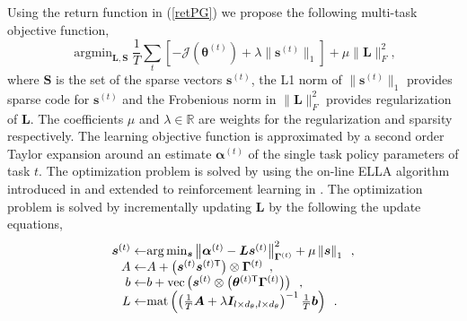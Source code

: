 \documentclass{aamas2016}
\renewcommand{\Re}{\mathbb{R}}
\newcommand{\transpose}{\text{$\mathsf{T}$}}
\DeclareMathOperator*{\argmin}{argmin}
\begin{document}
Using the return function in (\ref{retPG}) we propose the following multi-task objective function,
\begin{displaymath}
 \argmin_{\boldsymbol{L},\boldsymbol{S}}\frac{1}{T}\sum_{t}\left[ -\mathcal{J}(\boldsymbol{\theta}^{(t)}) + \lambda \| \boldsymbol{s}^{(t)} \|_{1} \right] + \mu\|\boldsymbol{L}\|_{F}^{2},
\end{displaymath}
where $\boldsymbol{S}$ is the set of the sparse vectors $\boldsymbol{s}^{(t)}$, the L1 norm of $\| \boldsymbol{s}^{(t)} \|_{1}$ 
provides sparse code for $\boldsymbol{s}^{(t)}$ and the Frobenious norm in $\|\boldsymbol{L}\|_{F}^{2}$ provides regularization of $\mathbf{L}$. The
coefficients $\mu$ and $\lambda \in \Re$ are weights for the regularization and sparsity respectively.
The learning objective function is approximated by a second order Taylor expansion around an estimate $\boldsymbol{\alpha}^{(t)}$ of
the single task policy parameters of task $t$. The optimization
problem is solved by using the on-line ELLA algorithm introduced in \cite{Ruvolo2013} and extended to reinforcement 
learning in \cite{BouAmmar2014a}. The optimization problem is solved by incrementally updating $\mathbf{L}$ by the following the
update equations,
\begin{equation}
\begin{array}{r@{}l}
 \boldsymbol{s}^{(t)}  \leftarrow&  \arg\min_{\boldsymbol{s}} \left\| \boldsymbol{\alpha}^{(t)}-\boldsymbol{L}\boldsymbol{s}^{(t)}\right\|_{\boldsymbol{\Gamma}^{(t)}}^{2} + \mu\left\|\boldsymbol{s}\right\|_{1} \enspace, \\%
 A  \leftarrow & A + \left(\boldsymbol{s}^{(t)}\boldsymbol{s}^{(t)\transpose} \right) \otimes \boldsymbol{\Gamma}^{(t)} \enspace, \\%
 b  \leftarrow &b + \mbox{vec}\left(  \boldsymbol{s}^{(t)} \otimes \left( \boldsymbol{\theta}^{(t)\transpose}\boldsymbol{\Gamma}^{(t)} \right) \right) \enspace, \\%
 L \leftarrow& \mbox{mat} \left( \left( \frac{1}{T}\boldsymbol{A} + \lambda\boldsymbol{I}_{l \times d_{\theta},l \times d_{\theta} }\right)^{-1} \frac{1}{T}\boldsymbol{b} \right) \enspace. %
 \label{onlineupdate}
\end{array}
\end{equation}
\end{document}
